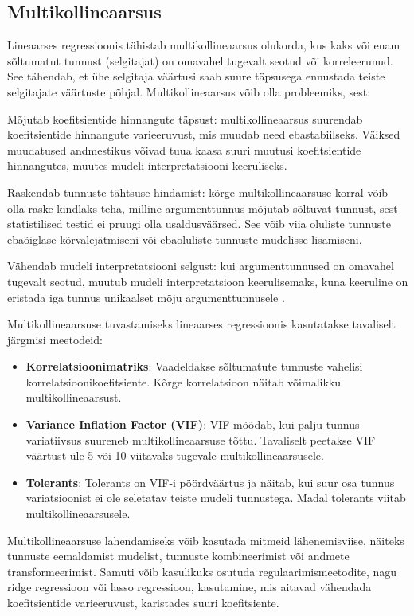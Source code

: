 \documentclass[
]{book}
\providecommand{\tightlist}{%
  \setlength{\itemsep}{0pt}\setlength{\parskip}{0pt}}
\begin{document}
\subsection{Multikollineaarsus}\label{multikollineaarsus}

Lineaarses regressioonis tähistab multikollineaarsus olukorda, kus kaks või enam sõltumatut tunnust (selgitajat) on omavahel tugevalt seotud või korreleerunud. See tähendab, et ühe selgitaja väärtusi saab suure täpsusega ennustada teiste selgitajate väärtuste põhjal. Multikollineaarsus võib olla probleemiks, sest:

Mõjutab koefitsientide hinnangute täpsust: multikollineaarsus suurendab koefitsientide hinnangute varieeruvust, mis muudab need ebastabiilseks. Väiksed muudatused andmestikus võivad tuua kaasa suuri muutusi koefitsientide hinnangutes, muutes mudeli interpretatsiooni keeruliseks.

Raskendab tunnuste tähtsuse hindamist: kõrge multikollineaarsuse korral võib olla raske kindlaks teha, milline argumenttunnus mõjutab sõltuvat tunnust, sest statistilised testid ei pruugi olla usaldusväärsed. See võib viia oluliste tunnuste ebaõiglase kõrvalejätmiseni või ebaoluliste tunnuste mudelisse lisamiseni.

Vähendab mudeli interpretatsiooni selgust: kui argumenttunnused on omavahel tugevalt seotud, muutub mudeli interpretatsioon keerulisemaks, kuna keeruline on eristada iga tunnus unikaalset mõju argumenttunnusele .

Multikollineaarsuse tuvastamiseks lineaarses regressioonis kasutatakse tavaliselt järgmisi meetodeid:

\begin{itemize}
\tightlist
\item
  \textbf{Korrelatsioonimatriks}: Vaadeldakse sõltumatute tunnuste vahelisi korrelatsioonikoefitsiente. Kõrge korrelatsioon näitab võimalikku multikollineaarsust.
\item
  \textbf{Variance Inflation Factor (VIF)}: VIF mõõdab, kui palju tunnus variatiivsus suureneb multikollineaarsuse tõttu. Tavaliselt peetakse VIF väärtust üle 5 või 10 viitavaks tugevale multikollineaarsusele.
\item
  \textbf{Tolerants}: Tolerants on VIF-i pöördväärtus ja näitab, kui suur osa tunnus variatsioonist ei ole seletatav teiste mudeli tunnustega. Madal tolerants viitab multikollineaarsusele.
\end{itemize}

Multikollineaarsuse lahendamiseks võib kasutada mitmeid lähenemisviise, näiteks tunnuste eemaldamist mudelist, tunnuste kombineerimist või andmete transformeerimist. Samuti võib kasulikuks osutuda regulaarimismeetodite, nagu ridge regressioon või lasso regressioon, kasutamine, mis aitavad vähendada koefitsientide varieeruvust, karistades suuri koefitsiente.
\end{document}
